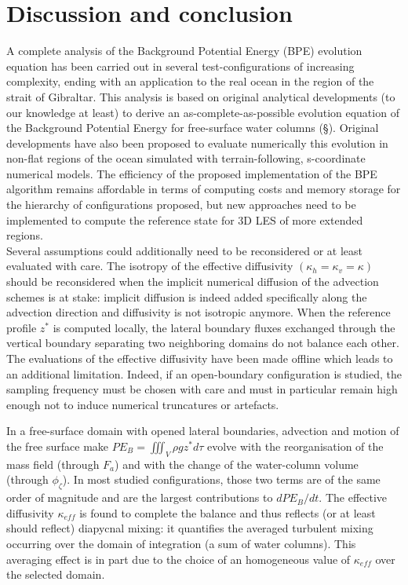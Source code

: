 \section{Discussion and conclusion}
A complete analysis of the Background Potential Energy (BPE) evolution equation has been carried out in several test-configurations of increasing complexity, ending with an application to the real ocean in the region of the strait of Gibraltar. This analysis is based on original analytical developments (to our knowledge at least) to derive an as-complete-as-possible evolution equation of the Background Potential Energy for free-surface water columns (\S {}). Original developments have also been proposed to evaluate numerically this evolution in non-flat regions of the ocean simulated with terrain-following, s-coordinate numerical models. The efficiency of the proposed implementation of the BPE algorithm remains affordable in terms of computing costs and memory storage for the hierarchy of configurations proposed, but new approaches need to be implemented to compute the reference state \citep{saenz_estimating_2015} for 3D LES of more extended regions.\\
Several assumptions could additionally need to be reconsidered or at least evaluated with care.
The isotropy of the effective diffusivity $(\kappa_h=\kappa_v=\kappa)$ should be reconsidered when the implicit numerical diffusion of the advection schemes is at stake: implicit diffusion is indeed added specifically along the advection direction and diffusivity is not isotropic anymore.
When the reference profile $z^*$ is computed locally, the lateral boundary fluxes exchanged through the vertical boundary separating two neighboring domains do not balance each other. 
The evaluations of the effective diffusivity have been made offline which leads to an additional limitation. Indeed, if an open-boundary configuration is studied, the sampling frequency must be chosen with care and must in particular remain high enough not to induce numerical truncatures or artefacts.

In a free-surface domain with opened lateral boundaries, advection and motion of the free surface make $PE_B=\iiint_V \rho g z^* d\tau$ evolve with the reorganisation of the mass field (through $F_a$) and with the change of the water-column volume (through $\phi_{\zeta}$). In most studied configurations, those two terms are of the same order of magnitude and are the largest contributions to $dPE_B/dt$. The effective diffusivity $\kappa_{eff}$ is found to complete the balance and thus reflects (or at least should reflect) diapycnal mixing: it quantifies the averaged turbulent mixing occurring over the domain of integration (a sum of water columns). 
This averaging effect is in part due to the choice of an homogeneous value of $\kappa_{eff}$ over the selected domain. 

